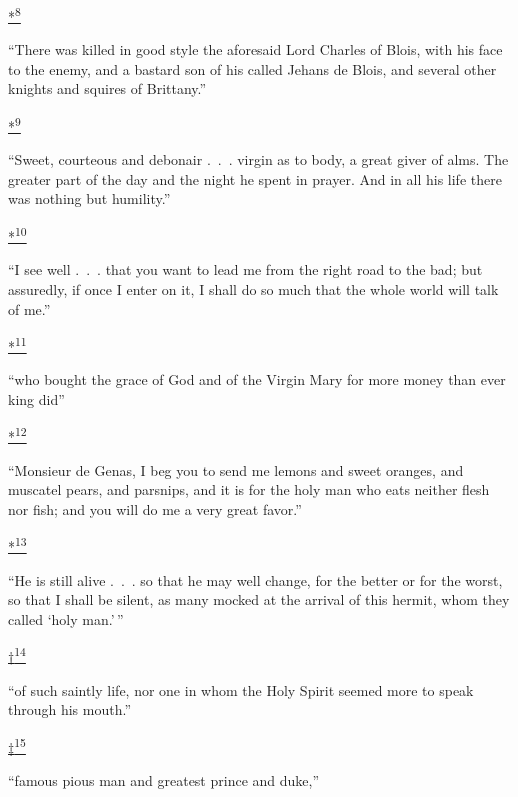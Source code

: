\protect\hypertarget{23_NOTES.xhtmlux5cux23id_2556}{\protect\hyperlink{14_Chapter_Seven__THE_PIOUS_PERSONA.xhtmlux5cux23id_2555}{*\textsuperscript{8}}}
``There was killed in good style the aforesaid Lord Charles of Blois,
with his face to the enemy, and a bastard son of his called Jehans de
Blois, and several other knights and squires of Brittany.''

\protect\hypertarget{23_NOTES.xhtmlux5cux23id_2558}{\protect\hyperlink{14_Chapter_Seven__THE_PIOUS_PERSONA.xhtmlux5cux23id_2557}{*\textsuperscript{9}}}
``Sweet, courteous and debonair .~.~. virgin as to body, a great giver
of alms. The greater part of the day and the night he spent in prayer.
And in all his life there was nothing but humility.''

\protect\hypertarget{23_NOTES.xhtmlux5cux23id_2560}{\protect\hyperlink{14_Chapter_Seven__THE_PIOUS_PERSONA.xhtmlux5cux23id_2559}{*\textsuperscript{10}}}
``I see well .~.~. that you want to lead me from the right road to the
bad; but assuredly, if once I enter on it, I shall do so much that the
whole world will talk of me.''

\protect\hypertarget{23_NOTES.xhtmlux5cux23id_2562}{\protect\hyperlink{14_Chapter_Seven__THE_PIOUS_PERSONA.xhtmlux5cux23id_2561}{*\textsuperscript{11}}}
``who bought the grace of God and of the Virgin Mary for more money than
ever king did''

\protect\hypertarget{23_NOTES.xhtmlux5cux23id_2320}{\protect\hyperlink{14_Chapter_Seven__THE_PIOUS_PERSONA.xhtmlux5cux23id_2319}{*\textsuperscript{12}}}
``Monsieur de Genas, I beg you to send me lemons and sweet oranges, and
muscatel pears, and parsnips, and it is for the holy man who eats
neither flesh nor fish; and you will do me a very great favor.''

\protect\hypertarget{23_NOTES.xhtmlux5cux23id_2322}{\protect\hyperlink{14_Chapter_Seven__THE_PIOUS_PERSONA.xhtmlux5cux23id_2321}{*\textsuperscript{13}}}
``He is still alive .~.~. so that he may well change, for the better or
for the worst, so that I shall be silent, as many mocked at the arrival
of this hermit, whom they called `holy man.'\,''

\protect\hypertarget{23_NOTES.xhtmlux5cux23id_2324}{\protect\hyperlink{14_Chapter_Seven__THE_PIOUS_PERSONA.xhtmlux5cux23id_2323}{†\textsuperscript{14}}}
``of such saintly life, nor one in whom the Holy Spirit seemed more to
speak through his mouth.''

\protect\hypertarget{23_NOTES.xhtmlux5cux23id_2326}{\protect\hyperlink{14_Chapter_Seven__THE_PIOUS_PERSONA.xhtmlux5cux23id_2325}{‡\textsuperscript{15}}}
``famous pious man and greatest prince and duke,''

